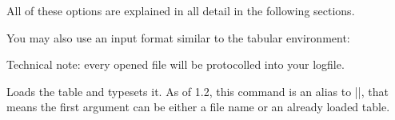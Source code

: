 \begin{command}{\pgfplotstabletypeset{}}
    \noindent All of these options are explained in all detail in the following
    sections.

    You may also use an input format similar to the tabular environment:
\begin{codeexample}[pre={\begin{lateximage}},post={\end{lateximage}},width=8cm]
\end{codeexample}

    Technical note: every opened file will be protocolled into your logfile.
\end{command}

\begin{command}{\pgfplotstabletypesetfile{}}
    Loads the table  and typesets it. As of \PGFPlotstable{}
    1.2, this command is an alias to |\pgfplotstabletypeset|, that means the
    first argument can be either a file name or an already loaded table.
\end{command}

